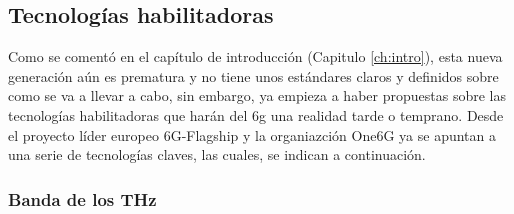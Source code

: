 \subsection{Tecnologías habilitadoras}

Como se comentó en el capítulo de introducción (Capitulo \ref{ch:intro}), esta nueva generación aún es prematura y no tiene unos estándares claros y definidos sobre como se va a llevar a cabo, sin embargo, ya empieza a haber propuestas sobre las tecnologías habilitadoras que harán del \gls{6g} una realidad tarde o temprano. Desde el proyecto líder europeo  6G-Flagship y la organiazción One6G ya se apuntan a una serie de tecnologías claves, las cuales, se indican a continuación.

\subsubsection{Banda de los THz}

